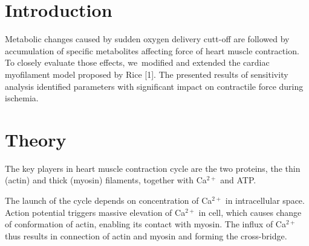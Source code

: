 \documentclass[a0,portrait]{a0poster}
\begin{document}
\vspace{1.3cm} %


\begin{multicols}{2} %


\color{SaddleBrown} %

\section*{Introduction}

Metabolic changes caused by sudden oxygen delivery cutt-off are followed
by accumulation of specific metabolites affecting force of heart muscle
contraction. To closely evaluate those effects, we~modified and extended
the cardiac myo\-filament model proposed by Rice [1]. The presented
results of sensitivity analysis identified parameters with significant
impact on contractile force during ischemia.

\color{DarkSlateGray} %

\section*{Theory}

The key players in heart muscle contraction cycle are the two proteins,
the thin (actin) and thick (myosin) filaments, together with
Ca${^\mathrm{2+}}$ and ATP. 

The launch of the cycle depends on concentration of Ca${^\mathrm{2+}}$
in intracellular space. Action potential triggers massive elevation of
Ca${^\mathrm{2+}}$ in cell, which causes change of conformation of 
actin, enabling its contact with myosin. The influx of Ca${^\mathrm{2+}}$
thus results in connection of actin and myosin and forming the cross-bridge.


\end{multicols}
\end{document}
